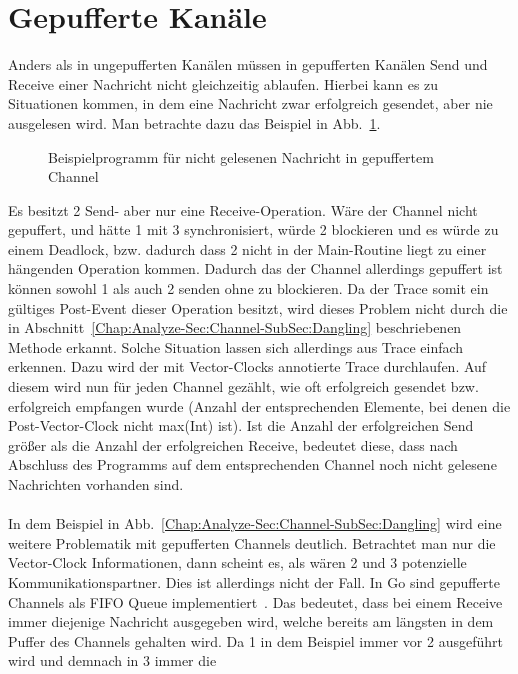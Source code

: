 \section{Gepufferte Kanäle}
Anders als in ungepufferten Kanälen müssen in gepufferten Kanälen Send und 
Receive einer Nachricht nicht gleichzeitig ablaufen. Hierbei kann es 
zu Situationen kommen, in dem eine Nachricht zwar erfolgreich gesendet, aber
nie ausgelesen wird. Man betrachte dazu das Beispiel in 
Abb.~\ref{Chap:Analyze-Sec:Channel-SubSec:Buffered-Fig:Ex1}.
\begin{figure}[h!]
  
  \caption{Beispielprogramm für nicht gelesenen Nachricht in gepuffertem Channel} 
  \label{Chap:Analyze-Sec:Channel-SubSec:Buffered-Fig:Ex1}
\end{figure}
Es besitzt 2 Send- aber nur eine Receive-Operation. Wäre der Channel nicht 
gepuffert, und hätte 1 mit 3 synchronisiert, würde 2 blockieren und es 
würde zu einem Deadlock, bzw. dadurch dass 2 nicht in der Main-Routine liegt
zu einer hängenden Operation kommen. Dadurch das der Channel allerdings gepuffert ist
können sowohl 1 als auch 2 senden ohne zu blockieren. Da der Trace somit ein gültiges Post-Event dieser Operation besitzt, 
wird dieses Problem nicht durch die in 
Abschnitt~\ref{Chap:Analyze-Sec:Channel-SubSec:Dangling} beschriebenen Methode erkannt.
Solche Situation lassen sich allerdings aus Trace einfach erkennen.
Dazu wird der mit Vector-Clocks annotierte Trace durchlaufen. Auf diesem 
wird nun für jeden Channel gezählt, wie oft erfolgreich gesendet bzw. erfolgreich empfangen 
wurde (Anzahl der entsprechenden Elemente, bei denen die Post-Vector-Clock 
nicht max(Int) ist). Ist die Anzahl der erfolgreichen Send größer als 
die Anzahl der erfolgreichen Receive, bedeutet diese, dass nach Abschluss des 
Programms auf dem entsprechenden Channel noch nicht gelesene Nachrichten vorhanden sind.\\\\
In dem Beispiel in Abb.~\ref{Chap:Analyze-Sec:Channel-SubSec:Dangling}
wird eine weitere Problematik mit gepufferten Channels deutlich. 
Betrachtet man nur die Vector-Clock Informationen, dann scheint es, als wären 
2 und 3 potenzielle Kommunikationspartner. Dies ist allerdings nicht der Fall. 
In Go sind gepufferte Channels als FIFO Queue implementiert~\cite{chan-impl}. 
Das bedeutet, dass bei einem Receive immer diejenige Nachricht ausgegeben wird, 
welche bereits am längsten in dem Puffer des Channels gehalten wird. Da 
1 in dem Beispiel immer vor 2 ausgeführt wird und demnach in 3 immer die 

